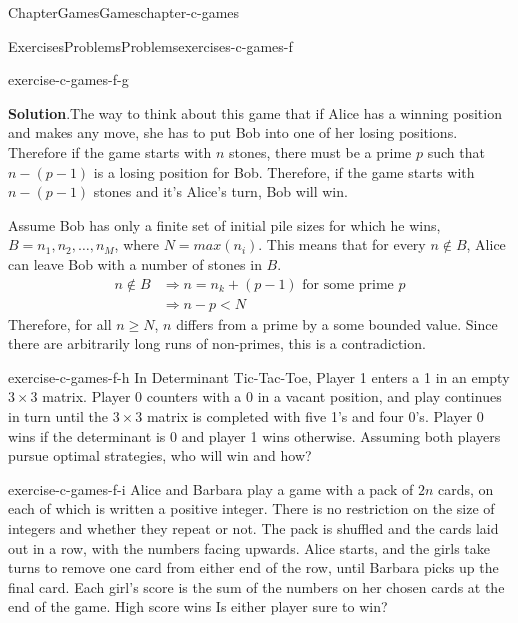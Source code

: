 \documentclass[oneside,10pt,]{book}
\newcommand{\blocktitlefont}{\relax}
\numberwithin{equation}{section}
\newcommand{\lt}{<}
\begin{document}
\begin{chapterptx}{Chapter}{Games}{}{Games}{}{}{chapter-c-games}
\begin{exercises-section}{Exercises}{Problems}{}{Problems}{}{}{exercises-c-games-f}
\begin{divisionexercise}{6}{}{}{exercise-c-games-f-g}
\par\smallskip%
\noindent\textbf{\blocktitlefont Solution}.\hypertarget{solution-c-games-f-g-b}{}\quad{}The way to think about this game that if Alice has a winning position and makes any move, she has to put Bob into one of her losing positions.  Therefore if the game starts with \(n\) stones, there must be a prime \(p\) such that \(n-(p-1)\) is a losing position for Bob.  Therefore, if the game starts with \(n-(p-1)\) stones and it's Alice's turn, Bob will win.%
\par
Assume Bob has only a finite set of initial pile sizes for which he wins, \(B={n_1,n_2, \dots, n_M}\), where \(N=max(n_i)\).  This means that for every \(n \notin B\), Alice can leave Bob with a number of stones in \(B\).%
\begin{equation*}
\begin{split}
n \notin B & \Rightarrow  n = n_k + (p-1)  \textrm{  for some prime }p\\
&  \Rightarrow  n-p \lt N
\end{split}
\end{equation*}
Therefore, for all \(n \geq N\), \(n\) differs from a prime by a some bounded value.  Since there are arbitrarily long runs of non-primes, this is a contradiction.%
\end{divisionexercise}%
\begin{divisionexercise}{7}{}{}{exercise-c-games-f-h}%
In  Determinant Tic-Tac-Toe, Player 1 enters a 1 in an empty \(3\times 3\) matrix. Player 0 counters with a 0 in a vacant position, and play continues in turn until the \(3 \times  3\) matrix is completed with five 1's and four 0's. Player 0 wins if the determinant is 0 and player 1 wins otherwise. Assuming both players pursue optimal strategies, who will win and how?%
\end{divisionexercise}%
\begin{divisionexercise}{8}{}{}{exercise-c-games-f-i}%
Alice and Barbara play a game with a pack of \(2n\) cards, on each of which is written a positive integer. There is no restriction on the size of integers and whether they repeat or not.   The pack is shuffled and the cards laid out in a row, with the numbers facing upwards. Alice starts, and the girls take turns to remove one card from either end of the row, until Barbara picks up the final card. Each girl's score is the sum of the numbers on her chosen cards at the end of the game. High score wins  Is either player sure to win?%
\par\smallskip%

\end{divisionexercise}
\end{exercises-section}
\end{chapterptx}
\end{document}

